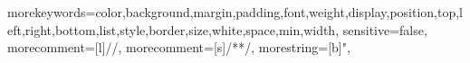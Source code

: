 {morekeywords={color,background,margin,padding,font,weight,display,position,top,left,right,bottom,list,style,border,size,white,space,min,width},
sensitive=false,
morecomment=[l]{//},
morecomment=[s]{/*}{*/},
morestring=[b]",
}


